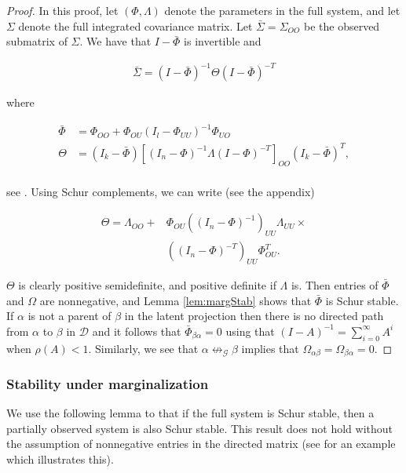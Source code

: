 \documentclass[accepted]{uai2021} %
\begin{document}
	\begin{proof}
		In this proof, let $(\Phi, \Lambda)$ denote the parameters in the full 
		system, and let $\Sigma$ denote the full integrated covariance matrix. 
		Let $\bar{\Sigma} = \Sigma_{OO}$ be 
		the observed submatrix of $\Sigma$. We 
		have 
		that $I - \bar{\Phi}$ is invertible and
		
		\begin{align}
		\bar{\Sigma} = (I - \bar{\Phi})^{-1}\Theta(I - \bar{\Phi})^{-T}
		\end{align}
		
		where 
		
		\begin{align*}
		\bar{\Phi} & = {\Phi}_{OO} +  {\Phi}_{OU}(I_l - 
		{\Phi}_{UU})^{-1}{\Phi}_{UO} \\
		\Theta & = (I_k-\bar{\Phi})[(I_n - {\Phi})^{-1}{\Lambda}(I - 
		{\Phi})^{-T}]_{OO}(I_k-\bar{\Phi})^T, \\
		\end{align*}
		
		see \citep{hyttinen2012}. Using Schur complements, we can write (see 
		the 
		appendix)
		
		\begin{align*}
		\Theta =  {\Lambda}_{OO} + & {\Phi}_{OU}((I_n - 
		{\Phi})^{-1})_{UU}{\Lambda}_{UU} \times  \\ & ((I_n - 
		{\Phi})^{-T})_{UU}
		{\Phi}_{OU}^T.
		\end{align*}
		
		$\Theta$ is clearly positive semidefinite, and positive definite if 
		$\Lambda$ is. Then entries of $\bar{\Phi}$ and $\Omega$ are 
		nonnegative, and Lemma \ref{lem:margStab} shows that $\bar{\Phi}$ is 
		Schur stable. If $\alpha$ is not a parent of 
		$\beta$ in the latent projection then there is no directed path from 
		$\alpha$ to $\beta$ in $\mathcal{D}$ and it follows that 
		$\bar{\Phi}_{\beta\alpha} = 0$ using that $(I-A)^{-1} = 
		\sum_{i=0}^\infty 
		A^i$ when $\rho(A) < 1$. Similarly, we see that 
		$\alpha\not\leftrightarrow_\mathcal{G}\beta$ implies that 
		$\Omega_{\alpha\beta} = \Omega_{\beta\alpha} = 0$. 
		
		
	\end{proof}


\subsubsection{Stability under marginalization}

We use the following lemma to that if the full system is Schur stable, then a 
partially observed system is also Schur stable. This result does not hold 
without the assumption of nonnegative entries in the directed matrix (see 
\cite{hyttinen2012} for an example which illustrates this).
\end{document}

